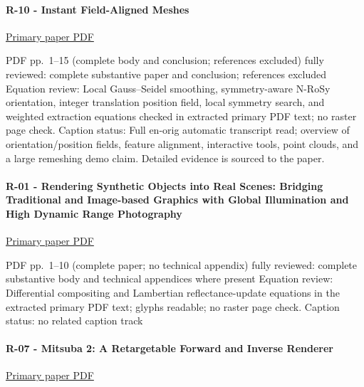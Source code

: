 \paragraph{R-10 - Instant Field-Aligned Meshes}\label{r-10---instant-field-aligned-meshes}

\href{https://igl.ethz.ch/projects/instant-meshes/instant-meshes-SA-2015-jakob-et-al-compressed.pdf}{Primary paper PDF}

PDF pp.~1--15 (complete body and conclusion; references excluded) fully reviewed: complete substantive paper and conclusion; references excluded Equation review: Local Gauss--Seidel smoothing, symmetry-aware N-RoSy orientation, integer translation position field, local symmetry search, and weighted extraction equations checked in extracted primary PDF text; no raster page check. Caption status: Full en-orig automatic transcript read; overview of orientation/position fields, feature alignment, interactive tools, point clouds, and a large remeshing demo claim. Detailed evidence is sourced to the paper.

\paragraph{R-01 - Rendering Synthetic Objects into Real Scenes: Bridging Traditional and Image-based Graphics with Global Illumination and High Dynamic Range Photography}\label{r-01---rendering-synthetic-objects-into-real-scenes-bridging-traditional-and-image-based-graphics-with-global-illumination-and-high-dynamic-range-photography}

\href{https://www.pauldebevec.com/Research/IBL/debevec-siggraph98.pdf}{Primary paper PDF}

PDF pp.~1--10 (complete paper; no technical appendix) fully reviewed: complete substantive body and technical appendices where present Equation review: Differential compositing and Lambertian reflectance-update equations in the extracted primary PDF text; glyphs readable; no raster page check. Caption status: no related caption track

\paragraph{R-07 - Mitsuba 2: A Retargetable Forward and Inverse Renderer}\label{r-07---mitsuba-2-a-retargetable-forward-and-inverse-renderer}

\href{https://rgl.s3.eu-central-1.amazonaws.com/media/papers/NimierDavidVicini2019Mitsuba2_7.pdf}{Primary paper PDF}

